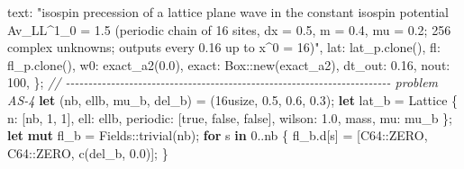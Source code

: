 \documentclass[
  10pt,
]{article}
\newenvironment{Shaded}{}{}
\newcommand{\CommentTok}[1]{\textcolor[rgb]{0.38,0.63,0.69}{\textit{#1}}}
\newcommand{\ConstantTok}[1]{\textcolor[rgb]{0.53,0.00,0.00}{#1}}
\newcommand{\ControlFlowTok}[1]{\textcolor[rgb]{0.00,0.44,0.13}{\textbf{#1}}}
\newcommand{\DataTypeTok}[1]{\textcolor[rgb]{0.56,0.13,0.00}{#1}}
\newcommand{\DecValTok}[1]{\textcolor[rgb]{0.25,0.63,0.44}{#1}}
\newcommand{\KeywordTok}[1]{\textcolor[rgb]{0.00,0.44,0.13}{\textbf{#1}}}
\newcommand{\NormalTok}[1]{#1}
\newcommand{\OperatorTok}[1]{\textcolor[rgb]{0.40,0.40,0.40}{#1}}
\newcommand{\PreprocessorTok}[1]{\textcolor[rgb]{0.74,0.48,0.00}{#1}}
\newcommand{\StringTok}[1]{\textcolor[rgb]{0.25,0.44,0.63}{#1}}
\begin{document}
\begin{Shaded}
\begin{Highlighting}[]
\NormalTok{        text}\OperatorTok{:} \StringTok{"isospin precession of a lattice plane wave in the constant isospin potential Av\_LL\^{}1\_0 = 1.5 (periodic chain of 16 sites, dx = 0.5, m = 0.4, mu = 0.2; 256 complex unknowns; outputs every 0.16 up to x\^{}0 = 16)"}\OperatorTok{,}
\NormalTok{        lat}\OperatorTok{:}\NormalTok{ lat\_p}\OperatorTok{.}\NormalTok{clone()}\OperatorTok{,}
\NormalTok{        fl}\OperatorTok{:}\NormalTok{ fl\_p}\OperatorTok{.}\NormalTok{clone()}\OperatorTok{,}
\NormalTok{        w0}\OperatorTok{:}\NormalTok{ exact\_a2(}\DecValTok{0.0}\NormalTok{)}\OperatorTok{,}
\NormalTok{        exact}\OperatorTok{:} \DataTypeTok{Box}\PreprocessorTok{::}\NormalTok{new(exact\_a2)}\OperatorTok{,}
\NormalTok{        dt\_out}\OperatorTok{:} \DecValTok{0.16}\OperatorTok{,}
\NormalTok{        nout}\OperatorTok{:} \DecValTok{100}\OperatorTok{,}
    \OperatorTok{\};}
    \CommentTok{// {-}{-}{-}{-}{-}{-}{-}{-}{-}{-}{-}{-}{-}{-}{-}{-}{-}{-}{-}{-}{-}{-}{-}{-}{-}{-}{-}{-}{-}{-}{-}{-}{-}{-}{-}{-}{-}{-}{-}{-}{-}{-}{-}{-}{-}{-}{-}{-}{-}{-}{-}{-}{-}{-}{-}{-}{-}{-}{-}{-}{-}{-}{-}{-}{-}{-}{-}{-}{-}{-}{-}{-} problem AS{-}4}
    \KeywordTok{let}\NormalTok{ (nb}\OperatorTok{,}\NormalTok{ ellb}\OperatorTok{,}\NormalTok{ mu\_b}\OperatorTok{,}\NormalTok{ del\_b) }\OperatorTok{=}\NormalTok{ (}\DecValTok{16usize}\OperatorTok{,} \DecValTok{0.5}\OperatorTok{,} \DecValTok{0.6}\OperatorTok{,} \DecValTok{0.3}\NormalTok{)}\OperatorTok{;}
    \KeywordTok{let}\NormalTok{ lat\_b }\OperatorTok{=}\NormalTok{ Lattice }\OperatorTok{\{}\NormalTok{ n}\OperatorTok{:}\NormalTok{ [nb}\OperatorTok{,} \DecValTok{1}\OperatorTok{,} \DecValTok{1}\NormalTok{]}\OperatorTok{,}\NormalTok{ ell}\OperatorTok{:}\NormalTok{ ellb}\OperatorTok{,}\NormalTok{ periodic}\OperatorTok{:}\NormalTok{ [}\ConstantTok{true}\OperatorTok{,} \ConstantTok{false}\OperatorTok{,} \ConstantTok{false}\NormalTok{]}\OperatorTok{,}\NormalTok{ wilson}\OperatorTok{:} \DecValTok{1.0}\OperatorTok{,}\NormalTok{ mass}\OperatorTok{,}\NormalTok{ mu}\OperatorTok{:}\NormalTok{ mu\_b }\OperatorTok{\};}
    \KeywordTok{let} \KeywordTok{mut}\NormalTok{ fl\_b }\OperatorTok{=} \PreprocessorTok{Fields::}\NormalTok{trivial(nb)}\OperatorTok{;}
    \ControlFlowTok{for}\NormalTok{ s }\KeywordTok{in} \DecValTok{0}\OperatorTok{..}\NormalTok{nb }\OperatorTok{\{}
\NormalTok{        fl\_b}\OperatorTok{.}\NormalTok{d[s] }\OperatorTok{=}\NormalTok{ [}\PreprocessorTok{C64::}\NormalTok{ZERO}\OperatorTok{,} \PreprocessorTok{C64::}\NormalTok{ZERO}\OperatorTok{,}\NormalTok{ c(del\_b}\OperatorTok{,} \DecValTok{0.0}\NormalTok{)]}\OperatorTok{;}
    \OperatorTok{\}}

\end{Highlighting}
\end{Shaded}
\end{document}
